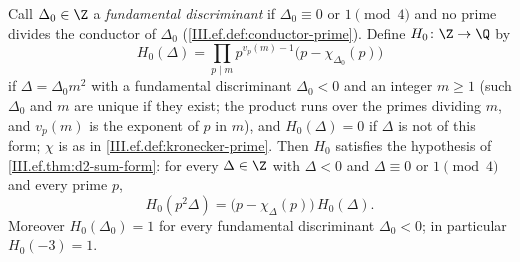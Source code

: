 Call $\Delta_0\in\Z$ a \emph{fundamental discriminant} if $\Delta_0\equiv0$ or $1\pmod4$ and no prime divides the conductor of $\Delta_0$
(\cref{III.ef.def:conductor-prime}). Define $H_0\colon\Z\to\Q$ by
\[
  H_0(\Delta)=\prod_{p\mid m}p^{v_p(m)-1}\bigl(p-\chi_{\Delta_0}(p)\bigr)
\]
if $\Delta=\Delta_0m^2$ with a fundamental discriminant $\Delta_0<0$ and an integer $m\ge1$ (such $\Delta_0$ and $m$ are unique if they exist; the
product runs over the primes dividing $m$, and $v_p(m)$ is the exponent of $p$ in $m$), and $H_0(\Delta)=0$ if $\Delta$ is not of this form; $\chi$ is
as in \cref{III.ef.def:kronecker-prime}. Then $H_0$ satisfies the hypothesis of \cref{III.ef.thm:d2-sum-form}: for every $\Delta\in\Z$ with
$\Delta<0$ and $\Delta\equiv0$ or $1\pmod4$ and every prime $p$,
\[
  H_0(p^2\Delta)=\bigl(p-\chi_\Delta(p)\bigr)\,H_0(\Delta).
\]
Moreover $H_0(\Delta_0)=1$ for every fundamental discriminant $\Delta_0<0$; in particular $H_0(-3)=1$.
